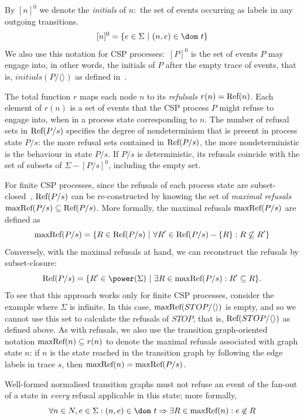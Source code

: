 By $[n]^0$ we denote the \emph{initials} of $n$:~the set of events occurring
as labels in any outgoing transitions.
$$
[n]^0 = \{ e\in\Sigma~|~(n,e)\in\dom~t \}
$$
We also use this notation for CSP processes:~$[P]^0$ is the set
of events $P$ may engage into, in other words, the initials of $P$ after the
empty trace of events, that is, $initials(P/\langle\rangle)$ as defined
in~\cite{Roscoe2010}.

The total function $r$ maps each node $n$ to its \emph{refulsals} $r(n) =
\text{Ref}(n)$. Each element of $r(n)$ is a set of events that the CSP process $P$
might refuse to engage into, when in a process state corresponding to $n$.
The number of refusal sets in $\text{Ref}(P/s)$ specifies the degree of
nondeterminism that is present in process state $P/s$: the more refusal sets
contained in  $\text{Ref}(P/s)$, the more nondeterministic is the behaviour in
state $P/s$. If $P/s$ is deterministic, its refusals coincide with the set of
subsets of $\Sigma - [P/s]^0$, including the empty set.

For finite CSP processes, since the refusals of each process state are
subset-closed~\cite{Hoare:1985:CSP:3921,Roscoe2010}, $\text{Ref}(P/s)$ can be
re-constructed by knowing the set of \emph{maximal refusals}
$\text{maxRef}(P/s)\subseteq\text{Ref}(P/s)$. More formally, the maximal refusals
$\text{maxRef}(P/s)$ are defined as
\begin{equation}
\text{maxRef}(P/s) = \{ R \in\text{Ref}(P/s)~|~\forall R'\in \text{Ref}(P/s) - \{ R\}: R \not\subseteq R'\}
\end{equation}
Conversely, with the maximal refusals at hand, we can reconstruct the refusals by subset-closure:
\begin{equation}
\refs(P/s) = \{ R'\in\power(\Sigma)~|~\exists R\in \maxrefs(P/s): R'\subseteq R \}.
\end{equation}
To see that this approach works only for finite CSP processes, consider the
example where $\Sigma$ is infinite. In this case,
$\text{maxRef}(STOP/\langle\rangle)$ is empty, and so we cannot use this set to
calculate the refusals of $STOP$, that is, $\text{Ref}(STOP/\langle\rangle)$ as
defined above. As with refusals, we also use the transition graph-oriented
notation $\text{maxRef}(n) \subseteq r(n)$ to denote the maximal refusals
associated with graph state $n$: if $n$ is the state reached in the
transition graph by following the edge labels in trace $s$, then $\text{maxRef}(n)
= \text{maxRef}(P/s)$.

Well-formed normalised transition graphs must not refuse an event of the
fan-out of a state in {\it every} refusal applicable in this state; more
formally,
\begin{equation}
\label{eq:wellformedg}
\forall n\in N, e\in\Sigma: (n,e)\in\dom~t \Rightarrow
\exists R\in \maxrefs(n): e\not\in R
\end{equation}


